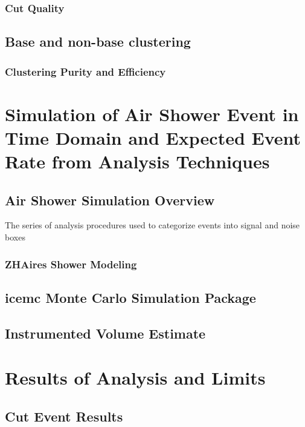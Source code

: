 	\subsection{Cut Quality}


\section{Base and non-base clustering}
	\subsection{Clustering Purity and Efficiency}


	
	

\chapter{Simulation of Air Shower Event in Time Domain and Expected Event Rate from Analysis Techniques}
\section{Air Shower Simulation Overview}
	The series of analysis procedures used to categorize events into signal and noise boxes
	\subsection{ZHAires Shower Modeling}
		
\section{icemc Monte Carlo Simulation Package}
	
\section{Instrumented Volume Estimate}
			
			
\chapter{Results of Analysis and Limits}
\section{Cut Event Results}

